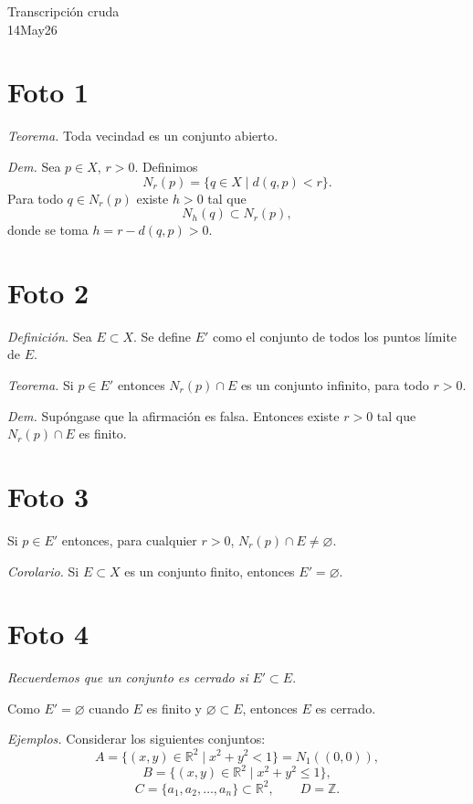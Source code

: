 \documentclass[12pt]{article}
\begin{document}
\begin{center}
{\Large Transcripción cruda}\\[2mm]
{\large 14May26}
\end{center}

\section*{Foto 1}

\textit{Teorema.} Toda vecindad es un conjunto abierto.

\textit{Dem.}
Sea $p\in X$, $r>0$.
Definimos
\[
N_r(p)=\{q\in X\mid d(q,p)<r\}.
\]
Para todo $q\in N_r(p)$ existe $h>0$ tal que
\[
N_h(q)\subset N_r(p),
\]
donde se toma $h=r-d(q,p)>0$.

\section*{Foto 2}

\textit{Definici\'on.}
Sea $E\subset X$.
Se define $E'$ como el conjunto de todos los puntos l\'imite de $E$.

\textit{Teorema.}
Si $p\in E'$ entonces $N_r(p)\cap E$ es un conjunto infinito, para todo $r>0$.

\textit{Dem.}
Sup\'ongase que la afirmaci\'on es falsa. Entonces existe $r>0$ tal que $N_r(p)\cap E$ es finito.

\section*{Foto 3}

Si $p\in E'$ entonces, para cualquier $r>0$, $N_r(p)\cap E\neq\varnothing$.

\textit{Corolario.}
Si $E\subset X$ es un conjunto finito, entonces $E'=\varnothing$.

\section*{Foto 4}

\textit{Recuerdemos que un conjunto es cerrado si} $E'\subset E$.

Como $E'=\varnothing$ cuando $E$ es finito y $\varnothing\subset E$, entonces $E$ es cerrado.

\textit{Ejemplos.}
Considerar los siguientes conjuntos:
\[
A=\{(x,y)\in\mathbb R^2\mid x^2+y^2<1\}=N_1((0,0)),
\]
\[
B=\{(x,y)\in\mathbb R^2\mid x^2+y^2\le 1\},
\]
\[
C=\{a_1,a_2,\dots,a_n\}\subset\mathbb R^2,
\qquad
D=\mathbb Z.
\]
\end{document}
